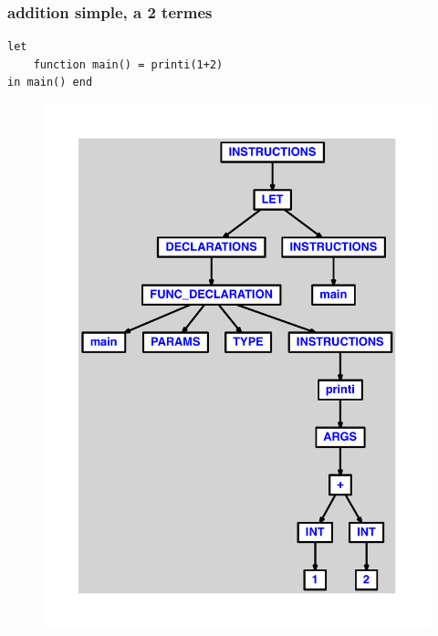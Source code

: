 \documentclass{article}
\begin{document}
\subsubsection{addition simple, a 2 termes}
\begin{lstlisting}
let
	function main() = printi(1+2)
in main() end
\end{lstlisting}
\newpage
\begin{figure}[H]
\centering
\includegraphics[max width=\textwidth]{ast/ast_39.pdf}
\end{figure}
\newpage
\end{document}
